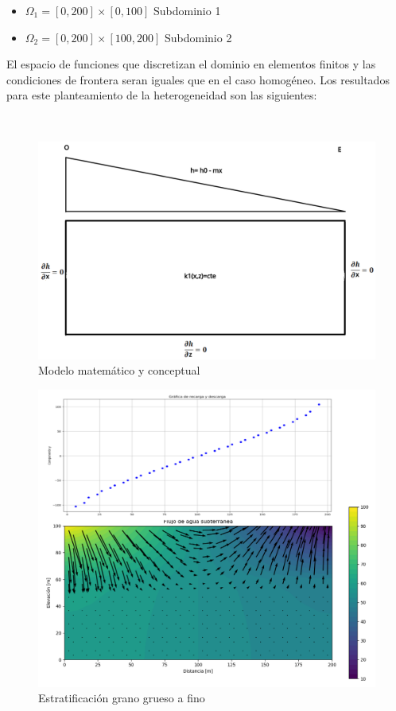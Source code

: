 \begin{itemize}
\item  ${\Omega}_{1}=[0,200]{\times}[0,100]$ Subdominio 1
\item  ${\Omega}_{2}=[0,200]{\times}[100,200]$ Subdominio 2
\end{itemize}

El espacio de funciones que discretizan el dominio en elementos finitos y las condiciones de frontera seran iguales que en el caso homogéneo. Los resultados para este planteamiento de la heterogeneidad son las siguientes:

\
\begin{figure}[H]
\centering
\includegraphics[scale=0.25]{Figura_27a.png}
\caption{ Modelo matemático y conceptual}
\label{Figura3:7a}
\end{figure}

\newpage

 \begin{figure}[H]
\centering
\includegraphics[scale=0.57]{Figura_33e.png}
\caption{ Estratificación grano grueso a fino}
\label{Figura3:7c}
\end{figure}

